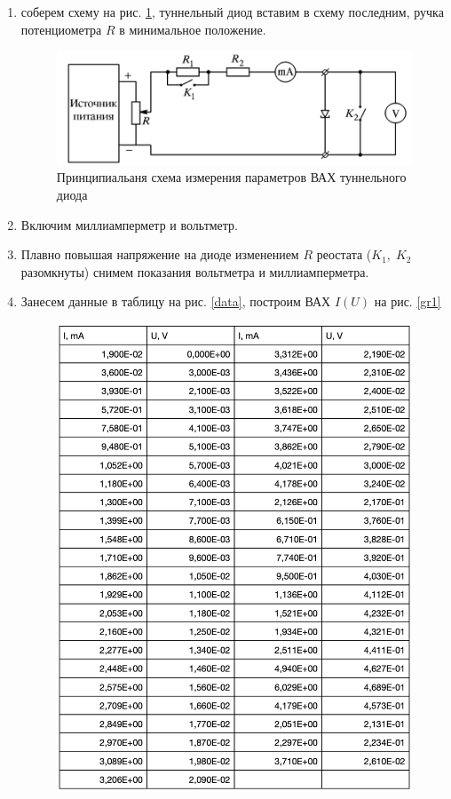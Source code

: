 \documentclass[a4paper]{article}
\begin{document}
\begin{enumerate}
    \item соберем схему на рис. \ref{stat}, туннельный диод вставим в схему последним, ручка потенциометра $R$ в минимальное положение. 
        \begin{figure}[H]
            \begin{center}
                \includegraphics[scale = 0.8]{stat.png}
                \caption{Принципиальаня схема измерения параметров ВАХ туннельного диода}
                \label{stat}
            \end{center}
        \end{figure}
    \item Включим миллиамперметр и вольтметр.
    \item Плавно повышая напряжение на диоде изменением $R$ реостата ($K_1,\; K_2$ разомкнуты) снимем показания вольтметра и миллиамперметра.
    \item Занесем данные в таблицу на рис.  \ref{data}, построим ВАХ $I(U)$ на рис. \ref{gr1} 
        \begin{figure}[H]
            \begin{center}
                \includegraphics[scale = 0.8]{data.png}

\end{center}
\end{figure}
\end{enumerate}
\end{document}

